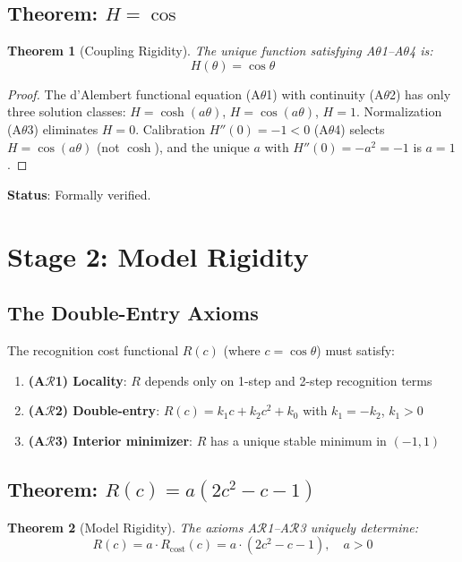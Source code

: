 \documentclass[12pt,a4paper]{article}
\newtheorem{theorem}{Theorem}[section]
\theoremstyle{definition}
\theoremstyle{remark}
\begin{document}
\subsection{Theorem: $H = \cos$}

\begin{theorem}[Coupling Rigidity]
The unique function satisfying A$\theta$1--A$\theta$4 is:
\begin{equation}
H(\theta) = \cos\theta
\end{equation}
\end{theorem}

\begin{proof}
The d'Alembert functional equation (A$\theta$1) with continuity (A$\theta$2) 
has only three solution classes: $H = \cosh(a\theta)$, $H = \cos(a\theta)$, $H = 1$.
Normalization (A$\theta$3) eliminates $H = 0$. Calibration $H''(0) = -1 < 0$ (A$\theta$4) 
selects $H = \cos(a\theta)$ (not $\cosh$), and the unique $a$ with $H''(0) = -a^2 = -1$ 
is $a = 1$.
\end{proof}

\textbf{Status}: Formally verified.

\section{Stage 2: Model Rigidity}

\subsection{The Double-Entry Axioms}

The recognition cost functional $R(c)$ (where $c = \cos\theta$) must satisfy:
\begin{enumerate}
\item \textbf{(A$\mathcal{R}$1) Locality}: $R$ depends only on 1-step and 2-step recognition terms
\item \textbf{(A$\mathcal{R}$2) Double-entry}: $R(c) = k_1 c + k_2 c^2 + k_0$ with $k_1 = -k_2$, $k_1 > 0$
\item \textbf{(A$\mathcal{R}$3) Interior minimizer}: $R$ has a unique stable minimum in $(-1, 1)$
\end{enumerate}

\subsection{Theorem: $R(c) = a(2c^2 - c - 1)$}

\begin{theorem}[Model Rigidity]
The axioms A$\mathcal{R}$1--A$\mathcal{R}$3 uniquely determine:
\begin{equation}
R(c) = a \cdot R_\mathrm{cost}(c) = a \cdot (2c^2 - c - 1), \quad a > 0
\end{equation}
\end{theorem}
\end{document}
